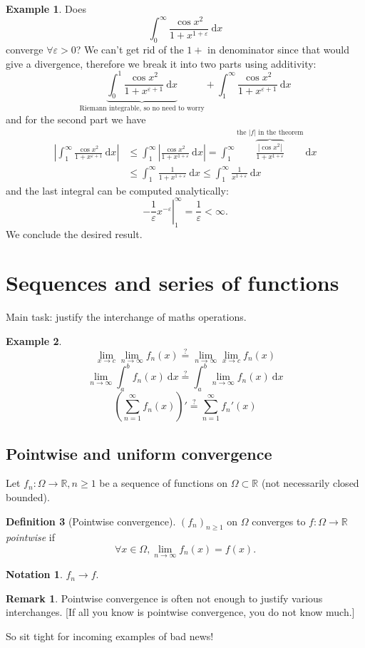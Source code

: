 \documentclass[a4paper]{article}
\theoremstyle{definition}
\newtheorem{defn}{Definition}[subsection]
\newtheorem{example}[defn]{Example}
\newtheorem*{remark}{Remark}
\newtheorem*{notation}{Notation}
\begin{document}
\begin{example}
Does
\[
\int_0^\infty \frac{\cos x^2}{1+x^{1+\varepsilon}} \ \mathrm d x
\]
converge $\forall \varepsilon >0$? We can't get rid of the $1+$ in denominator since that would give a divergence, therefore we break it into two parts using additivity:
\[
\underbrace{\int_0^1 \frac{\cos x^2}{1+x^{\varepsilon +1}} \ \mathrm d x}_{\text{Riemann integrable, so no need to worry}}+\int_1^\infty \frac{\cos x^2}{1+x^{\varepsilon +1}} \ \mathrm d x
\]
and for the second part we have
\[
\begin{aligned}
\left| \int_1^\infty \frac{\cos x^2}{1+x^{\varepsilon +1}} \ \mathrm d x\right| &\leq \int_1^\infty \left| \frac{\cos x^2}{1+x^{1+\varepsilon}} \ \mathrm d x \right| = \int_1^\infty \overbrace{\frac{|\cos x^2|}{1+x^{1+\varepsilon}}}^{\text{the }|f|\text{ in the theorem}} \ \mathrm d x \\
&\leq \int_1^\infty \frac{1}{1+x^{1+\varepsilon}} \ \mathrm d x \leq \int_1^\infty \frac{1}{x^{1+\varepsilon}} \ \mathrm d x
\end{aligned}
\]
and the last integral can be computed analytically:
\[
\left. -\frac{1}{\varepsilon} x^{-\varepsilon} \right|_1^\infty = \frac{1}{\varepsilon} < \infty.
\]
We conclude the desired result.
\end{example}

\section{Sequences and series of functions}
Main task: justify the interchange of maths operations.
\begin{example}
\[
\lim_{x\rightarrow c} \lim_{n\rightarrow \infty} f_n(x)\overset{?}{=} \lim_{n\rightarrow \infty}\lim_{x\rightarrow c} f_n(x)
\]
\[
\lim_{n\rightarrow \infty} \int_a^b f_n(x) \ \mathrm d x \overset{?}{=} \int_a^b \lim_{n\rightarrow \infty} f_n(x) \ \mathrm d x
\]
\[
\left(\sum_{n=1}^\infty f_n(x) \right)' \overset{?}{=} \sum_{n=1}^\infty f_n'(x)
\]
\end{example}

\subsection{Pointwise and uniform convergence}
Let $f_n:\Omega \rightarrow \mathbb R, n\geq 1$ be a sequence of functions on $\Omega \subset \mathbb R$ (not necessarily closed bounded).
\begin{defn}[Pointwise convergence]
$(f_n)_{n\geq 1}$ on $\Omega$ converges to $f:\Omega \rightarrow \mathbb R$ \textit{pointwise} if
\[
\forall x\in\Omega, \lim_{n\rightarrow \infty} f_n(x)=f(x) .
\]
\end{defn}
\begin{notation}
    $f_n \rightarrow f$.
\end{notation}
\begin{remark}
Pointwise convergence is often not enough to justify various interchanges. [If all you know is pointwise convergence, you do not know much.]
\end{remark}
So sit tight for incoming examples of bad news!
\end{document}
